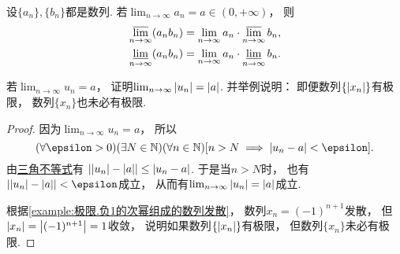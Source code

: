 \begin{example}
设\(\{a_n\},\{b_n\}\)都是数列.
若\(\lim_{n\to\infty} a_n = a \in (0,+\infty)\)，
则\begin{gather*}
	\varlimsup_{n\to\infty} (a_n b_n)
	= \lim_{n\to\infty} a_n \cdot \varlimsup_{n\to\infty} b_n, \\
	\varliminf_{n\to\infty} (a_n b_n)
	= \lim_{n\to\infty} a_n \cdot \varliminf_{n\to\infty} b_n.
\end{gather*}
\end{example}

\begin{example}
若\(\lim_{n\to\infty} u_n = a\)，
证明\(\lim_{n\to\infty} \abs{u_n} = \abs{a}\).
并举例说明：
即便数列\(\{\abs{x_n}\}\)有极限，
数列\(\{x_n\}\)也未必有极限.
\begin{proof}
因为\(\lim_{n\to\infty} u_n = a\)，
所以\[
	(\forall\epsilon>0)
	(\exists N\in\mathbb{N})
	(\forall n\in\mathbb{N})
	[n>N \implies \abs{u_n-a}<\epsilon].
\]
由\hyperref[theorem:不等式.三角不等式2]{三角不等式}有
\(\abs{\abs{u_n}-\abs{a}}\leq\abs{u_n-a}\).
于是当\(n>N\)时，
也有\(\abs{\abs{u_n}-\abs{a}}<\epsilon\)成立，
从而有\(\lim_{n\to\infty} \abs{u_n} = \abs{a}\)成立.

根据\cref{example:极限.负1的次幂组成的数列发散}，
数列\(x_n = (-1)^{n+1}\)发散，
但\(\abs{x_n} = \abs{(-1)^{n+1}} = 1\)收敛，
说明如果数列\(\{\abs{x_n}\}\)有极限，
但数列\(\{x_n\}\)未必有极限.
\end{proof}
\end{example}

